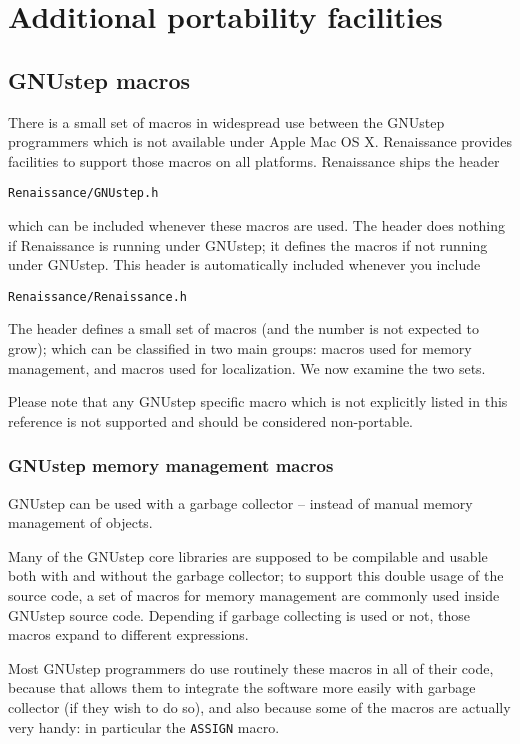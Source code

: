 \chapter{Additional portability facilities}

\section{GNUstep macros}
There is a small set of macros in widespread use between the GNUstep
programmers which is not available under Apple Mac OS X.  Renaissance
provides facilities to support those macros on all platforms.
Renaissance ships the header
\begin{verbatim}
Renaissance/GNUstep.h
\end{verbatim}
which can be included whenever these macros are used.  The header does
nothing if Renaissance is running under GNUstep; it defines the macros
if not running under GNUstep.  This header is automatically included
whenever you include
\begin{verbatim}
Renaissance/Renaissance.h
\end{verbatim}
The header defines a small set of macros (and the number is not
expected to grow); which can be classified in two main groups: macros
used for memory management, and macros used for localization.  We now
examine the two sets.

Please note that any GNUstep specific macro which is not explicitly
listed in this reference is not supported and should be considered
non-portable.

\subsection{GNUstep memory management macros}
GNUstep can be used with a garbage collector -- instead of manual
memory management of objects.

Many of the GNUstep core libraries are supposed to be compilable and
usable both with and without the garbage collector; to support this
double usage of the source code, a set of macros for memory management
are commonly used inside GNUstep source code.  Depending if garbage
collecting is used or not, those macros expand to different
expressions.

Most GNUstep programmers do use routinely these macros in all of their
code, because that allows them to integrate the software more easily
with garbage collector (if they wish to do so), and also because some
of the macros are actually very handy: in particular the
\texttt{ASSIGN} macro.

